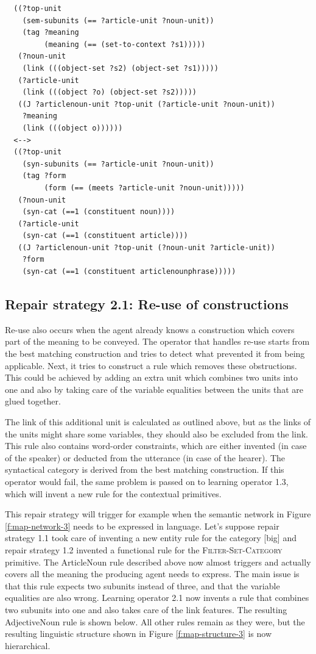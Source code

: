 \footnotesize
{}
\begin{lstlisting}
  ((?top-unit
    (sem-subunits (== ?article-unit ?noun-unit))
    (tag ?meaning 
         (meaning (== (set-to-context ?s1)))))
   (?noun-unit 
    (link (((object-set ?s2) (object-set ?s1)))))
   (?article-unit 
    (link (((object ?o) (object-set ?s2)))))
   ((J ?articlenoun-unit ?top-unit (?article-unit ?noun-unit))
    ?meaning
    (link (((object o))))))
  <-->
  ((?top-unit
    (syn-subunits (== ?article-unit ?noun-unit))
    (tag ?form 
         (form (== (meets ?article-unit ?noun-unit)))))
   (?noun-unit 
    (syn-cat (==1 (constituent noun))))
   (?article-unit 
    (syn-cat (==1 (constituent article))))
   ((J ?articlenoun-unit ?top-unit (?noun-unit ?article-unit))
    ?form
    (syn-cat (==1 (constituent articlenounphrase)))))
\end{lstlisting}
\normalsize

\subsection{Repair strategy 2.1: Re-use of constructions}

Re-use also occurs when the agent already knows a construction which
covers part of the meaning to be conveyed. The operator that handles
re-use starts from the best matching construction and tries to detect
what prevented it from being applicable. Next, it tries to construct a
rule which removes these obstructions. This could be achieved by
adding an extra unit which combines two units into one and also by
taking care of the variable equalities between the units that are
glued together.

The link of this additional unit is calculated as
outlined above, but as the links of the units might share some
variables, they should also be excluded from the link. This rule also
contains word-order constraints, which are either invented (in case of
the speaker) or deducted from the utterance (in case of the
hearer). The syntactical category is derived from the best matching
construction. If this operator would fail, the same problem is passed
on to learning operator 1.3, which will invent a new rule for the
contextual primitives.

This repair strategy will trigger for example when the semantic
network in Figure \ref{f:map-network-3} needs to be expressed in
language. Let's suppose repair strategy 1.1 took care of inventing a
new entity rule for the category [big] and repair strategy 1.2
invented a functional rule for the \textsc{Filter-Set-Category}
primitive. The ArticleNoun rule described above now almost
triggers and actually covers all the meaning the producing agent needs
to express. The main issue is that this rule expects two subunits
instead of three, and that the variable equalities are also wrong. Learning
operator 2.1 now invents a rule that combines two subunits into one
and also takes care of the link features. The resulting AdjectiveNoun
rule is shown below. All other rules remain as they were, but the
resulting linguistic structure shown in Figure \ref{f:map-structure-3}
is now hierarchical.

